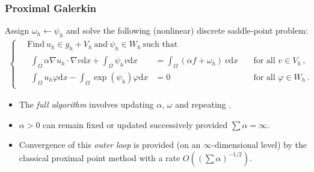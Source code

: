 \documentclass[aspectratio=169,xcolor=dvipsnames,11pt]{beamer}
\newcommand{\dd}{\mathrm{d}}
\newcommand{\fa}{\text{for all }}
\begin{document}
\begin{frame}\frametitle{Proximal Galerkin}{\scriptsize
\begin{algorithm2e}[H]
\DontPrintSemicolon
	\caption{\label{alg:EntropicGalerkinIntro} 	}
	{
		Assign $\omega_h \leftarrow \psi_{h}$ and
		solve the following (nonlinear) discrete saddle-point problem:  \vspace{-2ex}
		\begin{gather*}
			\left\{
			\begin{aligned}
				\,&\text{Find}~
				u_{h}\in g_h + V_{h} ~\text{and}~\psi_{h} \in W_{h}
				~\text{such that~}
				\\
				&\begin{alignedat}{4}
					\int_\Omega \alpha \nabla u_h\cdot \nabla v \dd x + \int_\Omega \psi_h v \dd x &= \int_\Omega (\alpha f + \omega_h)\, v \dd x
					&&~\fa v \in V_h
					\,,
					\\
					\int_\Omega u_h \varphi \dd x - \int_\Omega \exp(\psi_h) \varphi \dd x &= 0
					&&~\fa \varphi \in W_h 
					\,.
				\end{alignedat}
			\end{aligned}
			\right.
		\end{gather*}
		\;
		\vspace*{-\baselineskip} \vspace{-3ex}
	}
\end{algorithm2e}
}
{\scriptsize
\begin{itemize}
\item The \textit{full algorithm} involves updating $\alpha$, $\omega$ and repeating .
\item $\alpha > 0$ can remain fixed or updated successively provided  $\sum \alpha = \infty$.
\item Convergence of this \textit{outer loop} is provided (on an $\infty$-dimensional level) by the classical proximal point method with a rate $O((\sum \alpha)^{-1/2})$.
\end{itemize}
}
\end{frame}
\end{document}
